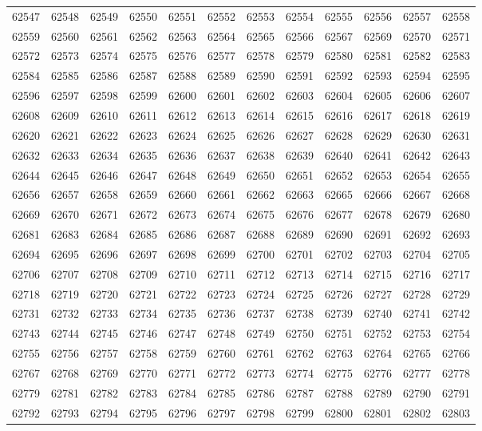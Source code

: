 \begin{center}
\begin{longtable}{llllllllllll}
62547 &62548 &62549 &62550 &62551 &62552 &62553 &62554 &62555 &62556 &62557 &62558 \\
62559 &62560 &62561 &62562 &62563 &62564 &62565 &62566 &62567 &62569 &62570 &62571 \\
62572 &62573 &62574 &62575 &62576 &62577 &62578 &62579 &62580 &62581 &62582 &62583 \\
62584 &62585 &62586 &62587 &62588 &62589 &62590 &62591 &62592 &62593 &62594 &62595 \\
62596 &62597 &62598 &62599 &62600 &62601 &62602 &62603 &62604 &62605 &62606 &62607 \\
62608 &62609 &62610 &62611 &62612 &62613 &62614 &62615 &62616 &62617 &62618 &62619 \\
62620 &62621 &62622 &62623 &62624 &62625 &62626 &62627 &62628 &62629 &62630 &62631 \\
62632 &62633 &62634 &62635 &62636 &62637 &62638 &62639 &62640 &62641 &62642 &62643 \\
62644 &62645 &62646 &62647 &62648 &62649 &62650 &62651 &62652 &62653 &62654 &62655 \\
62656 &62657 &62658 &62659 &62660 &62661 &62662 &62663 &62665 &62666 &62667 &62668 \\
62669 &62670 &62671 &62672 &62673 &62674 &62675 &62676 &62677 &62678 &62679 &62680 \\
62681 &62683 &62684 &62685 &62686 &62687 &62688 &62689 &62690 &62691 &62692 &62693 \\
62694 &62695 &62696 &62697 &62698 &62699 &62700 &62701 &62702 &62703 &62704 &62705 \\
62706 &62707 &62708 &62709 &62710 &62711 &62712 &62713 &62714 &62715 &62716 &62717 \\
62718 &62719 &62720 &62721 &62722 &62723 &62724 &62725 &62726 &62727 &62728 &62729 \\
62731 &62732 &62733 &62734 &62735 &62736 &62737 &62738 &62739 &62740 &62741 &62742 \\
62743 &62744 &62745 &62746 &62747 &62748 &62749 &62750 &62751 &62752 &62753 &62754 \\
62755 &62756 &62757 &62758 &62759 &62760 &62761 &62762 &62763 &62764 &62765 &62766 \\
62767 &62768 &62769 &62770 &62771 &62772 &62773 &62774 &62775 &62776 &62777 &62778 \\
62779 &62781 &62782 &62783 &62784 &62785 &62786 &62787 &62788 &62789 &62790 &62791 \\
62792 &62793 &62794 &62795 &62796 &62797 &62798 &62799 &62800 &62801 &62802 &62803 \\

\end{longtable}
\end{center}
